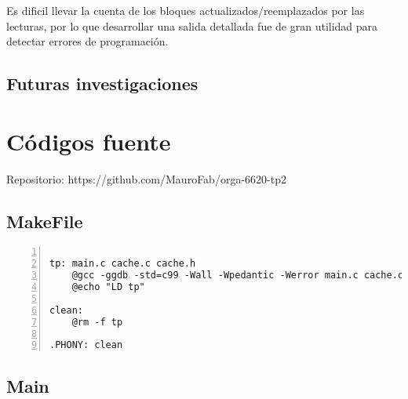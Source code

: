 \documentclass[11pt,a4paper]{article}
\begin{document}
Es dificil llevar la cuenta de los bloques actualizados/reemplazados por las lecturas, por lo que desarrollar
una salida detallada fue de gran utilidad para detectar errores de programación.


\subsection{Futuras investigaciones}



\newpage

\section{C\'odigos fuente}

Repositorio: https://github.com/MauroFab/orga-6620-tp2

\subsection{MakeFile}

\begin{lstlisting}[numbers=left, tabsize=2, basicstyle=\fontsize{11}{13}\ttfamily, frame=single, caption={makefile}]

tp: main.c cache.c cache.h
	@gcc -ggdb -std=c99 -Wall -Wpedantic -Werror main.c cache.c -o tp -lm
	@echo "LD tp"

clean:
	@rm -f tp

.PHONY: clean

\end{lstlisting}

\subsection{Main}
\end{document}
